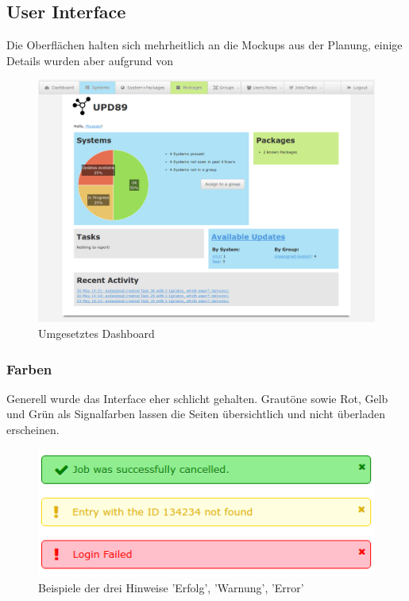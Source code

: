 \subsection*{User Interface}

Die Oberflächen halten sich mehrheitlich an die Mockups aus der Planung, einige Details wurden aber aufgrund von 

\begin{figure}[H]
	\centering
	\includegraphics[width=\linewidth]{files/upd89-screenshot_dashboard}
	\caption{Umgesetztes Dashboard}
	\label{fig:design:dashboard}
\end{figure}

\subsubsection*{Farben}

Generell wurde das Interface eher schlicht gehalten. Grautöne sowie Rot, Gelb und Grün als Signalfarben lassen die Seiten übersichtlich und nicht überladen erscheinen.

\begin{figure}[H]
	\centering
	\includegraphics[width=0.5\linewidth]{files/messages}
	\caption{Beispiele der drei Hinweise 'Erfolg', 'Warnung', 'Error'}
	\label{fig:design:messages}
\end{figure}




